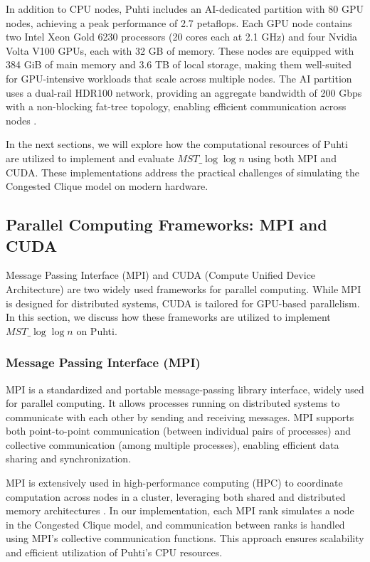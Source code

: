 \documentclass[english, 12pt, a4paper, elec, utf8, a-2b, online]{aaltothesis}
\newcommand{\mstalgo}{$MST\_\log\log{n}$}
\begin{document}
In addition to CPU nodes, Puhti includes an AI-dedicated partition with 80 GPU nodes, achieving a peak performance of 2.7 petaflops. Each GPU node contains two Intel Xeon Gold 6230 processors (20 cores each at 2.1 GHz) and four Nvidia Volta V100 GPUs, each with 32 GB of memory. These nodes are equipped with 384 GiB of main memory and 3.6 TB of local storage, making them well-suited for GPU-intensive workloads that scale across multiple nodes. The AI partition uses a dual-rail HDR100 network, providing an aggregate bandwidth of 200 Gbps with a non-blocking fat-tree topology, enabling efficient communication across nodes \cite{PuhtiDoc}.

In the next sections, we will explore how the computational resources of Puhti are utilized to implement and evaluate \mstalgo{} using both MPI and CUDA. These implementations address the practical challenges of simulating the Congested Clique model on modern hardware.

\subsection{Parallel Computing Frameworks: MPI and CUDA}
Message Passing Interface (MPI) and CUDA (Compute Unified Device Architecture) are two widely used frameworks for parallel computing. While MPI is designed for distributed systems, CUDA is tailored for GPU-based parallelism. In this section, we discuss how these frameworks are utilized to implement \mstalgo{} on Puhti.

\subsubsection{Message Passing Interface (MPI)}
MPI is a standardized and portable message-passing library interface, widely used for parallel computing. It allows processes running on distributed systems to communicate with each other by sending and receiving messages. MPI supports both point-to-point communication (between individual pairs of processes) and collective communication (among multiple processes), enabling efficient data sharing and synchronization.

MPI is extensively used in high-performance computing (HPC) to coordinate computation across nodes in a cluster, leveraging both shared and distributed memory architectures \cite{MPI}. In our implementation, each MPI rank simulates a node in the Congested Clique model, and communication between ranks is handled using MPI's collective communication functions. This approach ensures scalability and efficient utilization of Puhti's CPU resources.
\end{document}
